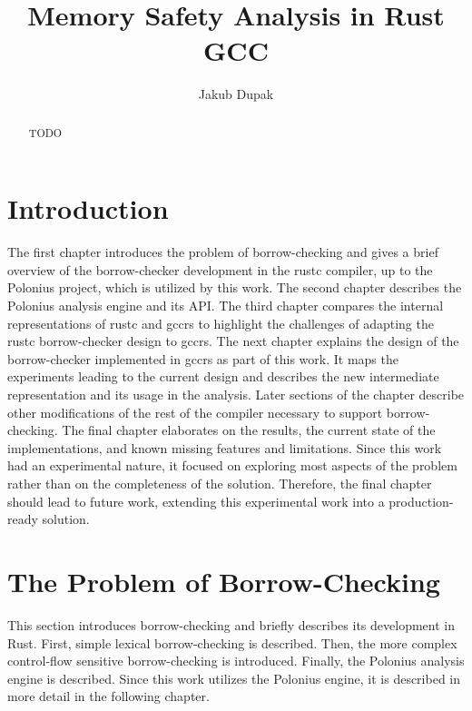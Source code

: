 \documentclass[
  11pt,
]{report}
\title{Memory Safety Analysis in Rust GCC}
\author{Jakub Dupak}
\date{}
\begin{document}
\maketitle
\begin{abstract}
TODO
\end{abstract}



{
\setcounter{tocdepth}{2}
\tableofcontents
}
\listoffigures
\chapter{Introduction}\label{introduction}

The first chapter introduces the problem of borrow-checking and gives a
brief overview of the borrow-checker development in the rustc compiler,
up to the Polonius project, which is utilized by this work. The second
chapter describes the Polonius analysis engine and its API. The third
chapter compares the internal representations of rustc and gccrs to
highlight the challenges of adapting the rustc borrow-checker design to
gccrs. The next chapter explains the design of the borrow-checker
implemented in gccrs as part of this work. It maps the experiments
leading to the current design and describes the new intermediate
representation and its usage in the analysis. Later sections of the
chapter describe other modifications of the rest of the compiler
necessary to support borrow-checking. The final chapter elaborates on
the results, the current state of the implementations, and known missing
features and limitations. Since this work had an experimental nature, it
focused on exploring most aspects of the problem rather than on the
completeness of the solution. Therefore, the final chapter should lead
to future work, extending this experimental work into a production-ready
solution.

\chapter{The Problem of
Borrow-Checking}\label{the-problem-of-borrow-checking}

This section introduces borrow-checking and briefly describes its
development in Rust. First, simple lexical borrow-checking is described.
Then, the more complex control-flow sensitive borrow-checking is
introduced. Finally, the Polonius analysis engine is described. Since
this work utilizes the Polonius engine, it is described in more detail
in the following chapter.
\end{document}
